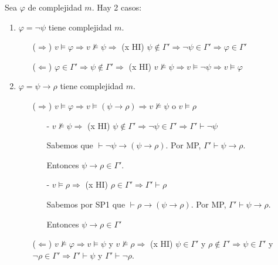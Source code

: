 \begin{questions}
\begin{solution}
\begin{enumerate}[\quad]
  Sea $\varphi$ de complejidad $m$. Hay 2 casos: 
  
  \begin{enumerate}
    \item $\varphi=\neg\psi$ tiene complejidad $m$. 
    
    \begin{itemize}
    \item[($\Rightarrow$)] $v\vDash\varphi \Rightarrow v \nvDash \psi \Rightarrow$ (x HI) $\psi\notin\Gamma' \Rightarrow \neg\psi\in\Gamma' \Rightarrow \varphi\in\Gamma'$
    \item[($\Leftarrow$)] $\varphi\in\Gamma' \Rightarrow \psi\notin\Gamma' \Rightarrow$ (x HI) $v\nvDash\psi \Rightarrow v\vDash\neg\psi \Rightarrow v\vDash\varphi$
    \end{itemize}

    \item $\varphi = \psi \rightarrow \rho$ tiene complejidad $m$. 
    
    \begin{itemize}
     \item[($\Rightarrow$)] $v\vDash\varphi \Rightarrow v\vDash (\psi \rightarrow \rho) \Rightarrow v\nvDash\psi$ o $v\vDash\rho$
     
     \begin{itemize}
      \item[-] $v\nvDash\psi \Rightarrow$ (x HI) $\psi\notin\Gamma' \Rightarrow \neg\psi\in\Gamma' \Rightarrow \Gamma'\vdash\neg\psi$
      
	Sabemos que $\vdash\neg\psi\rightarrow(\psi\rightarrow\rho)$. Por MP, $\Gamma'\vdash\psi\rightarrow\rho$. 
	
	Entonces $\psi\rightarrow\rho\in\Gamma'$.
      
      \item[-] $v\vDash\rho \Rightarrow$ (x HI) $\rho\in\Gamma' \Rightarrow \Gamma'\vdash\rho$ 
	
	Sabemos por SP1 que $\vdash\rho\rightarrow(\psi\rightarrow\rho)$. Por MP, $\Gamma'\vdash\psi\rightarrow\rho$.
	
	Entonces $\psi\rightarrow\rho\in\Gamma'$
      
     \end{itemize}
     
     \item[($\Leftarrow$)] $v\nvDash\varphi \Rightarrow v\vDash\psi$ y $v\nvDash\rho \Rightarrow$ (x HI) $\psi\in\Gamma'$ y $\rho\notin\Gamma' \Rightarrow \psi\in\Gamma'$ y $\neg\rho\in\Gamma' \Rightarrow \Gamma'\vdash\psi$ y $\Gamma'\vdash\neg\rho$.
     

\end{itemize}
\end{enumerate}
\end{enumerate}
\end{solution}
\end{questions}
